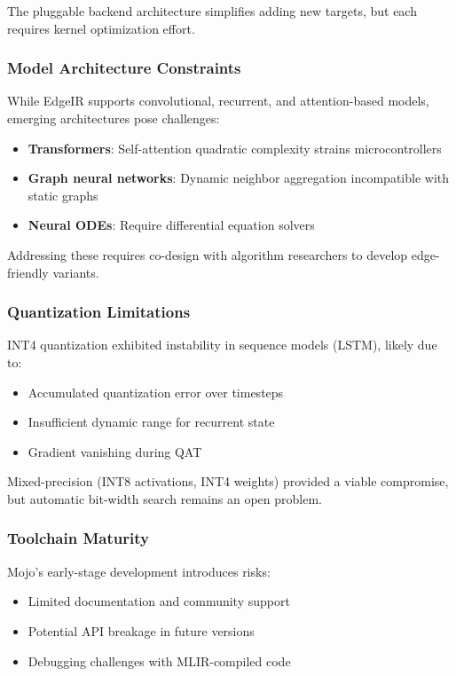 The pluggable backend architecture simplifies adding new targets, but each requires kernel optimization effort.

\subsubsection{Model Architecture Constraints}
While EdgeIR supports convolutional, recurrent, and attention-based models, emerging architectures pose challenges:
\begin{itemize}
\item \textbf{Transformers}: Self-attention quadratic complexity strains microcontrollers
\item \textbf{Graph neural networks}: Dynamic neighbor aggregation incompatible with static graphs
\item \textbf{Neural ODEs}: Require differential equation solvers
\end{itemize}

Addressing these requires co-design with algorithm researchers to develop edge-friendly variants.

\subsubsection{Quantization Limitations}
INT4 quantization exhibited instability in sequence models (LSTM), likely due to:
\begin{itemize}
\item Accumulated quantization error over timesteps
\item Insufficient dynamic range for recurrent state
\item Gradient vanishing during QAT
\end{itemize}

Mixed-precision (INT8 activations, INT4 weights) provided a viable compromise, but automatic bit-width search remains an open problem.

\subsubsection{Toolchain Maturity}
Mojo's early-stage development introduces risks:
\begin{itemize}
\item Limited documentation and community support
\item Potential API breakage in future versions
\item Debugging challenges with MLIR-compiled code
\end{itemize}

